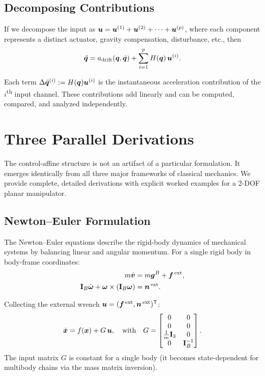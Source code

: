 \subsection{Decomposing Contributions}

If we decompose the input as $\bm{u} = \bm{u}^{(1)} + \bm{u}^{(2)} + \cdots + \bm{u}^{(p)}$,
where each component represents a distinct actuator, gravity compensation, disturbance,
etc., then
\begin{equation}
\ddot{\bm{q}} = a_{\text{drift}}(\bm{q},\dot{\bm{q}})
+ \sum_{i=1}^{p} H(\bm{q})\,\bm{u}^{(i)}.
\label{eq:ch3:decomposition}
\end{equation}

Each term $\Delta\ddot{\bm{q}}^{(i)} := H(\bm{q})\bm{u}^{(i)}$ is the instantaneous acceleration
contribution of the $i$\textsuperscript{th} input channel. These contributions add
linearly and can be computed, compared, and analyzed independently.


\section{Three Parallel Derivations}

The control-affine structure is not an artifact of a particular formulation. It emerges
identically from all three major frameworks of classical mechanics. We provide complete,
detailed derivations with explicit worked examples for a 2-DOF planar manipulator.

\subsection{Newton--Euler Formulation}

The Newton--Euler equations describe the rigid-body dynamics of mechanical systems by
balancing linear and angular momentum. For a single rigid body in body-frame coordinates:
\begin{align}
m\dot{\bm{v}} &= m\bm{g}^B + \bm{f}^{\,\text{ext}}, \label{eq:ch3:NE-lin}\\
\mathbf{I}_B\dot{\bm{\omega}} + \bm{\omega} \times (\mathbf{I}_B\bm{\omega})
&= \bm{n}^{\,\text{ext}}. \label{eq:ch3:NE-rot}
\end{align}

Collecting the external wrench $\bm{u} = (\bm{f}^{\,\text{ext}}, \bm{n}^{\,\text{ext}})^{\mathsf{T}}$:
\begin{equation}
\dot{\bm{x}} = f(\bm{x}) + G\,\bm{u},
\quad\text{with}\quad
G = \begin{bmatrix}
0 & 0 \\ 0 & 0 \\
\tfrac{1}{m}\mathbf{I}_3 & 0 \\
0 & \mathbf{I}_B^{-1}
\end{bmatrix}.
\label{eq:ch3:NE-affine}
\end{equation}
The input matrix $G$ is constant for a single body (it becomes state-dependent for
multibody chains via the mass matrix inversion).

